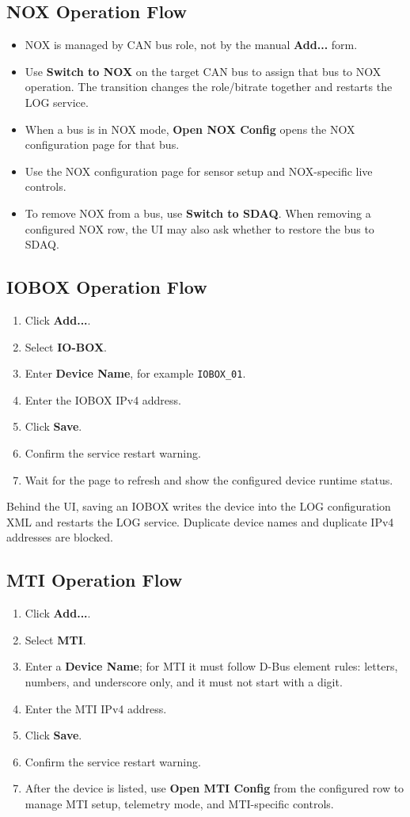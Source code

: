 \documentclass[11pt,a4paper]{article}
\begin{document}
\subsection{NOX Operation Flow}
\begin{itemize}
\item NOX is managed by CAN bus role, not by the manual \textbf{Add...} form.
\item Use \textbf{Switch to NOX} on the target CAN bus to assign that bus to NOX operation. The transition changes the role/bitrate together and restarts the LOG service.
\item When a bus is in NOX mode, \textbf{Open NOX Config} opens the NOX configuration page for that bus.
\item Use the NOX configuration page for sensor setup and NOX-specific live controls.
\item To remove NOX from a bus, use \textbf{Switch to SDAQ}. When removing a configured NOX row, the UI may also ask whether to restore the bus to SDAQ.
\end{itemize}

\subsection{IOBOX Operation Flow}
\begin{enumerate}
\item Click \textbf{Add...}.
\item Select \textbf{IO-BOX}.
\item Enter \textbf{Device Name}, for example \texttt{IOBOX\_01}.
\item Enter the IOBOX IPv4 address.
\item Click \textbf{Save}.
\item Confirm the service restart warning.
\item Wait for the page to refresh and show the configured device runtime status.
\end{enumerate}

Behind the UI, saving an IOBOX writes the device into the LOG configuration XML and restarts the LOG service. Duplicate device names and duplicate IPv4 addresses are blocked.

\subsection{MTI Operation Flow}
\begin{enumerate}
\item Click \textbf{Add...}.
\item Select \textbf{MTI}.
\item Enter a \textbf{Device Name}; for MTI it must follow D-Bus element rules: letters, numbers, and underscore only, and it must not start with a digit.
\item Enter the MTI IPv4 address.
\item Click \textbf{Save}.
\item Confirm the service restart warning.
\item After the device is listed, use \textbf{Open MTI Config} from the configured row to manage MTI setup, telemetry mode, and MTI-specific controls.
\end{enumerate}
\end{document}
